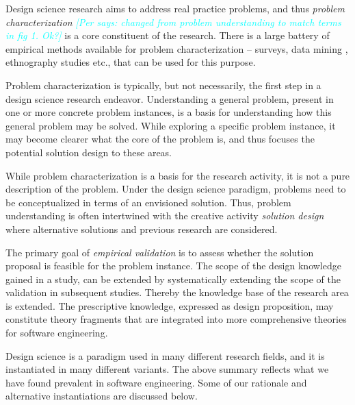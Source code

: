\documentclass[graybox]{svmult}
\newcommand{\per}[1]{\textcolor{cyan}{{\it [Per says: #1]}}}
\newcommand{\per}[1]{}
\begin{document}
Design science research aims to address real practice problems, and thus \emph{problem characterization} \per{changed from problem understanding to match terms in fig 1. Ok?} is a core constituent of the research. There is a large battery of empirical methods available for problem characterization -- surveys, data mining \cite{MenziesDataMining2016}, ethnography studies \cite{SharpEthnography2016} etc., that can be used for this purpose. 

Problem characterization is typically, but not necessarily, the first step in a design science research endeavor. Understanding a general problem, present in one or more concrete problem instances, is a basis for understanding how this general problem may be solved.  While exploring a specific problem instance,  it may become clearer what the core of the problem is, and thus focuses the potential solution design to these areas. 

While problem characterization is a basis for the research activity, it is not a pure description of the problem. Under the design science paradigm, problems need to be conceptualized in terms of an envisioned solution. Thus, problem understanding is often intertwined with the creative activity \emph{solution design} where alternative solutions and previous research are considered. %


 The primary goal of \emph{empirical validation} is to assess whether the solution proposal is feasible for the problem instance. The scope of the design knowledge gained in a study, can be extended by systematically extending the scope of the validation in subsequent studies. Thereby the knowledge base of the research area is extended. The prescriptive knowledge, expressed as design proposition,  may constitute theory fragments that are integrated into more comprehensive theories for software engineering. 


Design science is a paradigm used in many different research fields, and it is instantiated in many different variants.  The above summary reflects what we have found prevalent in software engineering. Some of our rationale and alternative instantiations are discussed below.
\end{document}
